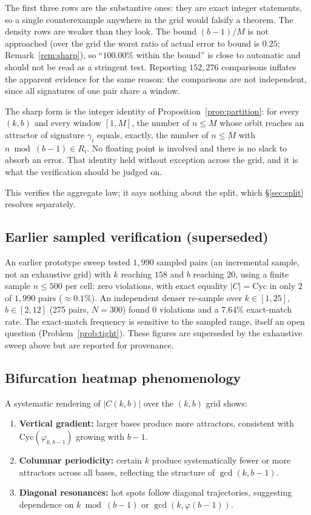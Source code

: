 \documentclass[11pt]{article}
\theoremstyle{definition}
\theoremstyle{remark}
\newcommand{\Cyc}{\mathrm{Cyc}}
\begin{document}
The first three rows are the substantive ones: they are exact integer statements, so a single counterexample anywhere in the grid would falsify a theorem. The density rows are weaker than they look. The bound $(b-1)/M$ is not approached (over the grid the worst ratio of actual error to bound is $0.25$; Remark~\ref{rem:sharp}), so ``$100.00\%$ within the bound'' is close to automatic and should not be read as a stringent test. Reporting $152{,}276$ comparisons inflates the apparent evidence for the same reason: the comparisons are not independent, since all signatures of one pair share a window.

The sharp form is the integer identity of Proposition~\ref{prop:partition}: for every $(k,b)$ and every window $[1,M]$, the number of $n \le M$ whose orbit reaches an attractor of signature $\gamma_i$ equals, exactly, the number of $n \le M$ with $n \bmod (b-1) \in R_i$. No floating point is involved and there is no slack to absorb an error. That identity held without exception across the grid, and it is what the verification should be judged on.

This verifies the aggregate law; it says nothing about the split, which \S\ref{sec:split} resolves separately.

\subsection{Earlier sampled verification (superseded)}

An earlier prototype sweep tested $1{,}990$ sampled pairs (an incremental sample, not an exhaustive grid) with $k$ reaching $158$ and $b$ reaching $20$, using a finite sample $n \le 500$ per cell: zero violations, with exact equality $|C| = \Cyc$ in only $2$ of $1{,}990$ pairs ($\approx 0.1\%$). An independent denser re-sample over $k \in [1,25]$, $b \in [2,12]$ (275 pairs, $N = 300$) found 0 violations and a $7.64\%$ exact-match rate. The exact-match frequency is sensitive to the sampled range, itself an open question (Problem~\ref{prob:tight}). These figures are superseded by the exhaustive sweep above but are reported for provenance.

\subsection{Bifurcation heatmap phenomenology}

A systematic rendering of $|C(k,b)|$ over the $(k,b)$ grid shows:
\begin{enumerate}
\item \textbf{Vertical gradient:} larger bases produce more attractors, consistent with $\Cyc(\varphi_{k,b-1})$ growing with $b-1$.
\item \textbf{Columnar periodicity:} certain $k$ produce systematically fewer or more attractors across all bases, reflecting the structure of $\gcd(k, b-1)$.
\item \textbf{Diagonal resonances:} hot spots follow diagonal trajectories, suggesting dependence on $k \bmod (b-1)$ or $\gcd(k, \varphi(b-1))$.
\end{enumerate}
\end{document}
